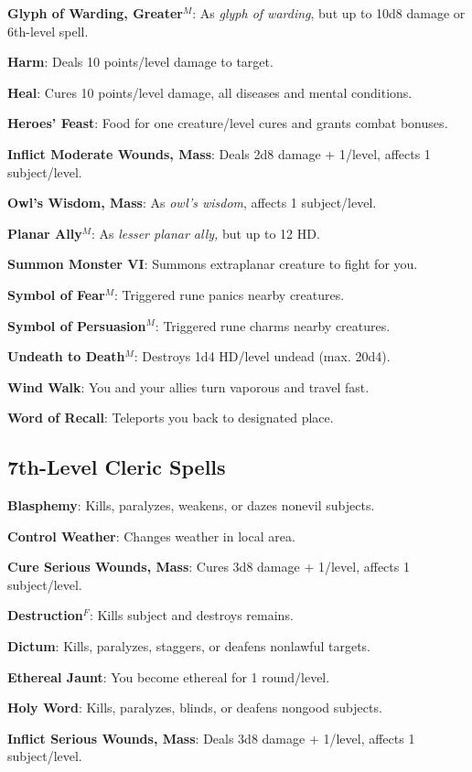 \textbf{Glyph of Warding, Greater}\(^{M}\): As \textit{glyph of warding}, but up to 10d8 damage or 6th-level spell.

\textbf{Harm}: Deals 10 points/level damage to target.

\textbf{Heal}: Cures 10 points/level damage, all diseases and mental conditions.

\textbf{Heroes' Feast}: Food for one creature/level cures and grants combat bonuses\textit{.}

\textbf{Inflict Moderate Wounds, Mass}: Deals 2d8 damage + 1/level, affects 1 subject/level.

\textbf{Owl's Wisdom, Mass}: As \textit{owl's wisdom}, affects 1 subject/level.

\textbf{Planar Ally}\(^{M}\): As \textit{lesser planar ally, }but up to 12 HD.

\textbf{Summon Monster VI}: Summons extraplanar creature to fight for you.

\textbf{Symbol of Fear}\(^{M}\): Triggered rune panics nearby creatures.

\textbf{Symbol of Persuasion}\(^{M}\): Triggered rune charms nearby creatures.

\textbf{Undeath to Death}\(^{M}\): Destroys 1d4 HD/level undead (max. 20d4).

\textbf{Wind Walk}: You and your allies turn vaporous and travel fast.

\textbf{Word of Recall}: Teleports you back to designated place.

\subsection{7th-Level Cleric Spells}


\textbf{Blasphemy}: Kills, paralyzes, weakens, or dazes nonevil subjects.

\textbf{Control Weather}: Changes weather in local area.

\textbf{Cure Serious Wounds, Mass}: Cures 3d8 damage + 1/level, affects 1 subject/level.

\textbf{Destruction}\(^{F}\): Kills subject and destroys remains.

\textbf{Dictum}: Kills, paralyzes, staggers, or deafens nonlawful targets.

\textbf{Ethereal Jaunt}: You become ethereal for 1 round/level.

\textbf{Holy Word}: Kills, paralyzes, blinds, or deafens nongood subjects.

\textbf{Inflict Serious Wounds, Mass}: Deals 3d8 damage + 1/level, affects 1 subject/level.

